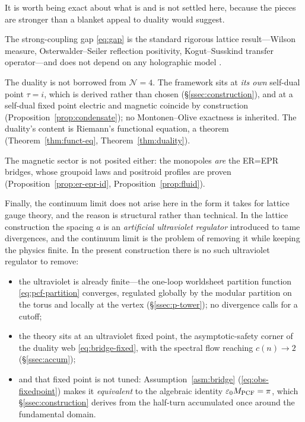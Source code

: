 \begin{remark}\label{rmk:residual}
It is worth being exact about what is and is not settled here, because the pieces are stronger than
a blanket appeal to duality would suggest.

The strong-coupling gap \eqref{eq:gap} is the standard rigorous lattice result---Wilson measure,
Osterwalder--Seiler reflection positivity, Kogut--Susskind transfer operator---and does not depend on
any holographic model .

The duality is not borrowed from $\mathcal N=4$. The framework sits at \emph{its own} self-dual point
$\tau=i$, which is derived rather than chosen (\S\ref{ssec:construction}), and at a self-dual fixed
point electric and magnetic coincide by construction (Proposition~\ref{prop:condensate}); no
Montonen--Olive exactness is inherited. The duality's content is Riemann's functional equation, a
theorem (Theorem~\ref{thm:funct-eq}, Theorem~\ref{thm:duality}).


The magnetic sector is not posited either: the monopoles \emph{are} the ER=EPR bridges, whose
groupoid laws and positroid profiles are proven (Proposition~\ref{prop:er-epr-id},
Proposition~\ref{prop:fluid}).


Finally, the continuum limit does not arise here in the form it takes for lattice gauge theory, and
the reason is structural rather than technical. In the lattice construction the spacing $a$ is an
\emph{artificial ultraviolet regulator} introduced to tame divergences, and the continuum limit is the
problem of removing it while keeping the physics finite. In the present construction there is no such
ultraviolet regulator to remove:

\begin{itemize}
\item the ultraviolet is already finite---the one-loop worldsheet partition function
      \eqref{eq:pcf-partition} converges, regulated globally by the modular partition on the torus
      and locally at the vertex (\S\ref{ssec:p-tower}); no divergence calls for a cutoff;
\item the theory sits at an ultraviolet fixed point, the asymptotic-safety corner of the duality web
      \eqref{eq:bridge-fixed}, with the spectral flow reaching $c(n)\to2$
      (\S\ref{ssec:accum});
\item and that fixed point is not tuned: Assumption~\ref{asm:bridge} (\eqref{eq:obs-fixedpoint}) makes it \emph{equivalent} to the
      algebraic identity $\varepsilon_{0}M_{\mathrm{PCF}}=\pi$, which \S\ref{ssec:construction} derives from the half-turn
      accumulated once around the fundamental domain.
\end{itemize}


\end{remark}
